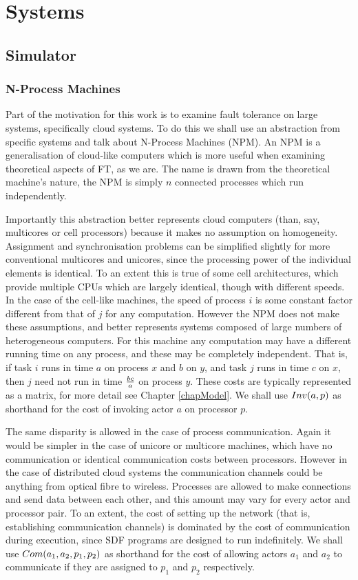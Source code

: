 \chapter{Systems}
\label{chapSystems}

\section{Simulator}

\subsection{N-Process Machines}

Part of the motivation for this work is to examine fault tolerance on large systems, specifically cloud systems.
To do this we shall use an abstraction from specific systems and talk about N-Process Machines (NPM).
An NPM is a generalisation of cloud-like computers which is more useful when examining theoretical aspects of FT, as we are.
The name is drawn from the theoretical machine's nature, the NPM is simply $n$ connected processes which run independently.

Importantly this abstraction better represents cloud computers (than, say, multicores or cell processors) because it makes no assumption on homogeneity.
Assignment and synchronisation problems can be simplified slightly for more conventional multicores and unicores, since the processing power of the individual elements is identical.
To an extent this is true of some cell architectures, which provide multiple CPUs which are largely identical, though with different speeds.
In the case of the cell-like machines, the speed of process $i$ is some constant factor different from that of $j$ for any computation.
However the NPM does not make these assumptions, and better represents systems composed of large numbers of heterogeneous computers.
For this machine any computation may have a different running time on any process, and these may be completely independent.
That is, if task $i$ runs in time $a$ on process $x$ and $b$ on $y$, and task $j$ runs in time $c$ on $x$, then $j$ need not run in time ${bc}\over{a}$ on process $y$.
These costs are typically represented as a matrix, for more detail see Chapter \ref{chapModel}.
We shall use $Inv(a, p)$ as shorthand for the cost of invoking actor $a$ on processor $p$.

The same disparity is allowed in the case of process communication.
Again it would be simpler in the case of unicore or multicore machines, which have no communication or identical communication costs between processors.
However in the case of distributed cloud systems the communication channels could be anything from optical fibre to wireless.
Processes are allowed to make connections and send data between each other, and this amount may vary for every actor and processor pair.
To an extent, the cost of setting up the network (that is, establishing communication channels) is dominated by the cost of communication during execution, since SDF programs are designed to run indefinitely.
We shall use $Com(a_1, a_2, p_1, p_2)$ as shorthand for the cost of allowing actors $a_1$ and $a_2$ to communicate if they are assigned to $p_1$ and $p_2$ respectively.

